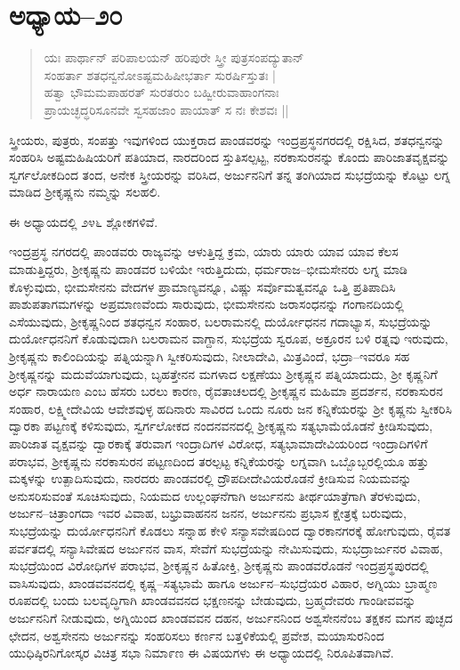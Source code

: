 \section{ಅಧ್ಯಾಯ–೨೦}

\begin{verse}
ಯಃ ಪಾರ್ಥಾನ್ ಪರಿಪಾಲಯನ್ ಹರಿಪುರೇ ಸ್ತ್ರೀ ಪುತ್ರಸಂಪದ್ಯುತಾನ್\\ ಸಂಹರ್ತಾ ಶತಧನ್ವನೋಽಷ್ಟಮಹಿಷೀಭರ್ತಾ ಸುರರ್ಷಿಸ್ತುತಃ |\\ ಹತ್ವಾ ಭೌಮಮಪಾಹರತ್ ಸುರತರುಂ ಬಹ್ವೀರುವಾಹಾಂಗನಾಃ \\ ಪ್ರಾಯಚ್ಛದ್ಧರಿಸೂನವೇ ಸ್ವಸಹಜಾಂ ಪಾಯಾತ್ ಸ ನಃ ಕೇಶವಃ ||
\end{verse}

 ಸ್ತ್ರೀಯರು, ಪುತ್ರರು, ಸಂಪತ್ತು ಇವುಗಳಿಂದ ಯುಕ್ತರಾದ ಪಾಂಡವರನ್ನು ಇಂದ್ರಪ್ರಸ್ಥನಗರದಲ್ಲಿ ರಕ್ಷಿಸಿದ, ಶತಧನ್ವನನ್ನು ಸಂಹರಿಸಿ ಅಷ್ಟಮಹಿಷಿಯರಿಗೆ ಪತಿಯಾದ, ನಾರದರಿಂದ ಸ್ತುತಿಸಲ್ಪಟ್ಟ, ನರಕಾಸುರನನ್ನು ಕೊಂದು ಪಾರಿಜಾತವೃಕ್ಷವನ್ನು ಸ್ವರ್ಗಲೋಕದಿಂದ ತಂದ, ಅನೇಕ ಸ್ತ್ರೀಯರನ್ನು ವರಿಸಿದ, ಅರ್ಜುನನಿಗೆ ತನ್ನ ತಂಗಿಯಾದ ಸುಭದ್ರೆಯನ್ನು ಕೊಟ್ಟು ಲಗ್ನ ಮಾಡಿದ ಶ‍್ರೀಕೃಷ್ಣನು ನಮ್ಮನ್ನು ಸಲಹಲಿ.

ಈ ಅಧ್ಯಾಯದಲ್ಲಿ ೨೪೬ ಶ್ಲೋಕಗಳಿವೆ.

ಇಂದ್ರಪ್ರಸ್ಥ ನಗರದಲ್ಲಿ ಪಾಂಡವರು ರಾಜ್ಯವನ್ನು ಆಳುತ್ತಿದ್ದ ಕ್ರಮ, ಯಾರು ಯಾರು ಯಾವ ಯಾವ ಕೆಲಸ ಮಾಡುತ್ತಿದ್ದರು, ಶ‍್ರೀಕೃಷ್ಣನು ಪಾಂಡವರ ಬಳಿಯೇ ಇರುತ್ತಿದುದು, ಧರ್ಮರಾಜ–ಭೀಮಸೇನರು ಲಗ್ನ ಮಾಡಿ ಕೊಳ್ಳುವುದು, ಭೀಮಸೇನನು ವೇದಗಳ ಪ್ರಾಮಾಣ್ಯವನ್ನೂ, ವಿಷ್ಣು ಸರ್ವೊಮತ್ವವನ್ನೂ ಒತ್ತಿ ಪ್ರತಿಪಾದಿಸಿ ಪಾಶುಪತಾಗಮಗಳನ್ನು ಅಪ್ರಮಾಣವೆಂದು ಸಾರುವುದು, ಭೀಮಸೇನನು ಜರಾಸಂಧನನ್ನು ಗಂಗಾನದಿಯಲ್ಲಿ ಎಸೆಯುವುದು, ಶ‍್ರೀಕೃಷ್ಣನಿಂದ ಶತಧನ್ವನ ಸಂಹಾರ, ಬಲರಾಮನಲ್ಲಿ ದುರ್ಯೋಧನನ ಗದಾಭ್ಯಾಸ, ಸುಭದ್ರೆಯನ್ನು ದುರ್ಯೋಧನನಿಗೆ ಕೊಡುವುದಾಗಿ ಬಲರಾಮನ ವಾಗ್ದಾನ, ಸುಭದ್ರೆಯ ಸ್ವರೂಪ, ಅಕ್ರೂರನ ಬಳಿ ರತ್ನವು ಇರುವುದು, ಶ‍್ರೀಕೃಷ್ಣನು ಕಾಲಿಂದಿಯನ್ನು ಪತ್ನಿಯನ್ನಾಗಿ ಸ್ವೀಕರಿಸುವುದು, ನೀಲಾದೇವಿ, ಮಿತ್ರವಿಂದೆ, ಭದ್ರಾ–ಇವರೂ ಸಹ ಶ‍್ರೀಕೃಷ್ಣನನ್ನು ಮದುವೆಯಾಗುವುದು, ಬೃಹತ್ತೇನನ ಮಗಳಾದ ಲಕ್ಷಣೆಯು ಶ‍್ರೀಕೃಷ್ಣನ ಪತ್ನಿಯಾದುದು, ಶ‍್ರೀ ಕೃಷ್ಣನಿಗೆ ಅರ್ಧ ನಾರಾಯಣ ಎಂಬ ಹೆಸರು ಬರಲು ಕಾರಣ, ರೈವತಾಚಲದಲ್ಲಿ ಶ‍್ರೀಕೃಷ್ಣನ ಮಹಿಮಾ ಪ್ರದರ್ಶನ, ನರಕಾಸುರನ ಸಂಹಾರ, ಲಕ್ಷ್ಮೀದೇವಿಯ ಆವೇಶವುಳ್ಳ ಹದಿನಾರು ಸಾವಿರದ ಒಂದು ನೂರು ಜನ ಕನ್ನಿಕೆಯರನ್ನು ಶ‍್ರೀ ಕೃಷ್ಣನು ಸ್ವೀಕರಿಸಿ ದ್ವಾರಕಾ ಪಟ್ಟಣಕ್ಕೆ ಕಳಿಸುವುದು, ಸ್ವರ್ಗಲೋಕದ ನಂದನವನದಲ್ಲಿ ಶ‍್ರೀಕೃಷ್ಣನು ಸತ್ಯಭಾಮೆಯೊಡನೆ ಕ್ರೀಡಿಸುವುದು, ಪಾರಿಜಾತ ವೃಕ್ಷವನ್ನು ದ್ವಾರಕಾಕ್ಕೆ ತರುವಾಗ ಇಂದ್ರಾದಿಗಳ ವಿರೋಧ, ಸತ್ಯಭಾಮಾದೇವಿಯರಿಂದ ಇಂದ್ರಾದಿಗಳಿಗೆ ಪರಾಭವ, ಶ‍್ರೀಕೃಷ್ಣನು ನರಕಾಸುರನ ಪಟ್ಟಣದಿಂದ ತರಲ್ಪಟ್ಟ ಕನ್ನಿಕೆಯರನ್ನು ಲಗ್ನವಾಗಿ ಒಬ್ಬೊಬ್ಬರಲ್ಲಿಯೂ ಹತ್ತು ಮಕ್ಕಳನ್ನು ಉತ್ಪಾದಿಸುವುದು, ನಾರದರು ಪಾಂಡವರಲ್ಲಿ ದ್ರೌಪದೀದೇವಿಯರೊಡನೆ ಕ್ರೀಡಿಸುವ ನಿಯಮವನ್ನು ಅನುಸರಿಸುವಂತೆ ಸೂಚಿಸುವುದು, ನಿಯಮದ ಉಲ್ಲಂಘನೆಗಾಗಿ ಅರ್ಜುನನು ತೀರ್ಥಯಾತ್ರೆಗಾಗಿ ತೆರಳುವುದು, ಅರ್ಜುನ–ಚಿತ್ರಾಂಗದಾ ಇವರ ವಿವಾಹ, ಬಭ್ರುವಾಹನನ ಜನನ, ಅರ್ಜುನನು ಪ್ರಭಾಸ ಕ್ಷೇತ್ರಕ್ಕೆ ಬರುವುದು, ಸುಭದ್ರೆಯನ್ನು ದುರ್ಯೋಧನನಿಗೆ ಕೊಡಲು ಸನ್ನಾಹ ಕೇಳಿ ಸನ್ಯಾಸವೇಷದಿಂದ ದ್ವಾರಕಾನಗರಕ್ಕೆ ಹೋಗುವುದು, ರೈವತ ಪರ್ವತದಲ್ಲಿ ಸನ್ಯಾಸಿವೇಷದ ಅರ್ಜುನನ ವಾಸ, ಸೇವೆಗೆ ಸುಭದ್ರೆಯನ್ನು ನೇಮಿಸುವುದು, ಸುಭದ್ರಾರ್ಜುನರ ವಿವಾಹ, ಸುಭದ್ರೆಯಿಂದ ವಿರೋಧಿಗಳ ಪರಾಭವ, ಶ‍್ರೀಕೃಷ್ಣನ ಹಿತೋಕ್ತಿ, ಶ‍್ರೀಕೃಷ್ಣನು ಪಾಂಡವರೊಡನೆ ಇಂದ್ರಪ್ರಸ್ಥಪುರದಲ್ಲಿ ವಾಸಿಸುವುದು, ಖಾಂಡವವನದಲ್ಲಿ ಕೃಷ್ಣ–ಸತ್ಯಭಾಮೆ ಹಾಗೂ ಅರ್ಜುನ–ಸುಭದ್ರೆಯರ ವಿಹಾರ, ಅಗ್ನಿಯು ಬ್ರಾಹ್ಮಣ ರೂಪದಲ್ಲಿ ಬಂದು ಬಲವೃದ್ಧಿಗಾಗಿ ಖಾಂಡವವನದ ಭಕ್ಷಣನನ್ನು ಬೇಡುವುದು, ಬ್ರಹ್ಮದೇವರು ಗಾಂಡೀವವನ್ನು ಅರ್ಜುನನಿಗೆ ನೀಡುವುದು, ಅಗ್ನಿಯಿಂದ ಖಾಂಡವವನ ದಹನ, ಅರ್ಜುನನಿಂದ ಅಶ್ವಸೇನನೆಂಬ ತಕ್ಷಕನ ಮಗನ ಪುಚ್ಛದ ಛೇದನ, ಅಶ್ವಸೇನನು ಅರ್ಜುನನ್ನು ಸಂಹರಿಸಲು ಕರ್ಣನ ಬತ್ತಳಿಕೆಯಲ್ಲಿ ಪ್ರವೇಶ, ಮಯಾಸುರನಿಂದ ಯುಧಿಷ್ಠಿರನಿಗೋಸ್ಕರ ವಿಚಿತ್ರ ಸಭಾ ನಿಮಾ೯ಣ ಈ ವಿಷಯಗಳು ಈ ಅಧ್ಯಾಯದಲ್ಲಿ ನಿರೂಪಿತವಾಗಿವೆ.


